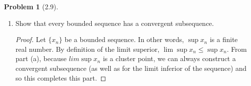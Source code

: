 \documentclass[12pt]{article}
\theoremstyle{definition}
\newtheorem{problem}{Problem}
\begin{document}
\begin{problem}[2.9]
\begin{enumerate}[label = (\alph{*}.)]
\begin{proof}
                By a reverse argument, we can show that \( \lim \inf x_n \) is a cluster point of \( \{ x_n\} \) as well as the smallest cluster point.
            \end{proof}
        \item Show that every bounded sequence has a convergent subsequence.
        
            \begin{proof}
                Let \( \{ x_n \} \) be a bounded sequence. In other words, \( \sup x_n \) is a  finite real number. By definition of the limit superior, \( \lim \sup x_n \leq \sup x_n \). From part (a), because \( lim \sup x_n \) is a cluster point, we  can always construct a convergent subsequence (as well as for the limit inferior of the sequence) and so this completes this part.
            \end{proof}
    \end{enumerate}

\end{problem}
\end{document}
